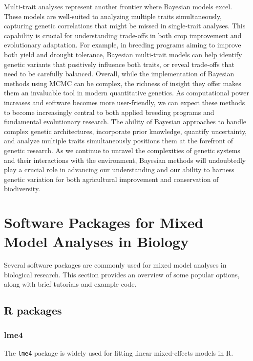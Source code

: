 \documentclass[12pt,a4paper]{article}
\begin{document}
Multi-trait analyses represent another frontier where Bayesian models excel. These models are well-suited to analyzing multiple traits simultaneously, capturing genetic correlations that might be missed in single-trait analyses. This capability is crucial for understanding trade-offs in both crop improvement and evolutionary adaptation. For example, in breeding programs aiming to improve both yield and drought tolerance, Bayesian multi-trait models can help identify genetic variants that positively influence both traits, or reveal trade-offs that need to be carefully balanced. Overall, while the implementation of Bayesian methods using MCMC can be complex, the richness of insight they offer makes them an invaluable tool in modern quantitative genetics. As computational power increases and software becomes more user-friendly, we can expect these methods to become increasingly central to both applied breeding programs and fundamental evolutionary research. The ability of Bayesian approaches to handle complex genetic architectures, incorporate prior knowledge, quantify uncertainty, and analyze multiple traits simultaneously positions them at the forefront of genetic research. As we continue to unravel the complexities of genetic systems and their interactions with the environment, Bayesian methods will undoubtedly play a crucial role in advancing our understanding and our ability to harness genetic variation for both agricultural improvement and conservation of biodiversity.

\section{Software Packages for Mixed Model Analyses in Biology}

Several software packages are commonly used for mixed model analyses in biological research. This section provides an overview of some popular options, along with brief tutorials and example code.

\subsection{R packages}

\subsubsection{lme4}

The \texttt{lme4} package is widely used for fitting linear mixed-effects models in R.
\end{document}
